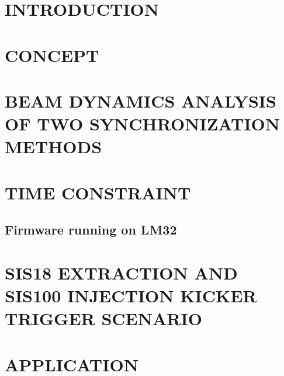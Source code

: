 \documentclass[%
 reprint,
 amsmath,amssymb,
 aps,
]{revtex4-1}
\begin{document}
\maketitle


\section{\label{sec:introduction}INTRODUCTION}


\section{\label{sec:concept}CONCEPT}


\section{\label{sec:dynamics}BEAM DYNAMICS ANALYSIS OF TWO SYNCHRONIZATION METHODS}


\section{\label{sec:testsetup}TIME CONSTRAINT}


\subsection{\label{sec:testsetup}Firmware running on LM32}


%

\section{\label{sec:kicker}SIS18 EXTRACTION AND SIS100 INJECTION KICKER TRIGGER SCENARIO}




\section{\label{sec:application}APPLICATION}

\end{document}
